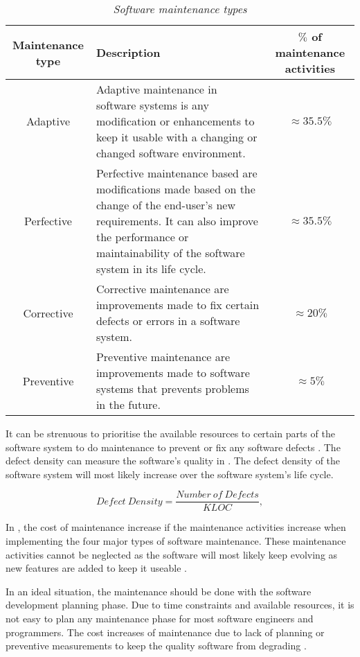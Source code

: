\begin{table}[!htb]
	\centering
	\small
	\caption[Software maintenance types]
	{\textit{Software maintenance types \cite{Ping2010,Hasan2012,Mamone1994}}}
	\label{tbl:CH1_MaintenanceTypes}
	\begin{tabularx}{\textwidth}{|c|X|c|}
		\hline
		\textbf{Maintenance type} & \textbf{Description} & \textbf{$\%$ of maintenance activities} \\ \hline
		Adaptive & \raggedright Adaptive maintenance in software systems is any modification or enhancements to keep it usable with a changing or changed software environment. & $\approx 35.5\%$ \\ \hline
		Perfective & Perfective maintenance based are modifications made based on the change of the end-user's new requirements. It can also improve the performance or maintainability of the software system in its life cycle. & $\approx 35.5\%$ \\ \hline
		Corrective & \raggedright Corrective maintenance are improvements made to fix certain defects or errors in a software system. & $\approx 20\%$ \\ \hline
		Preventive & \raggedright  Preventive maintenance are improvements made to software systems that prevents problems in the future. & $\approx 5\%$ \\ \hline
	\end{tabularx}
\end{table}

It can be strenuous to prioritise the available resources to certain parts of the software system to do maintenance to prevent or fix any software defects \cite{Mamone1994, Hasan2012}. The defect density can measure the software's quality in  \cite{Shah2012, Alenezi2016}. The defect density of the software system will most likely increase over the software system's life cycle.

\begin{equation}
	\label{eq:Defect_Density}
	Defect~Density = \frac{Number~of~Defects}{KLOC},
\end{equation}

In , the cost of maintenance increase if the maintenance activities increase when implementing the four major types of software maintenance. These maintenance activities cannot be neglected as the software will most likely keep evolving as new features are added to keep it useable \cite{Alenezi2016}. \par In an ideal situation, the maintenance should be done with the software development planning phase. Due to time constraints and available resources, it is not easy to plan any maintenance phase for most software engineers and programmers. The cost increases of maintenance due to lack of planning or preventive measurements to keep the quality software from degrading \cite{Alenezi2016}.

